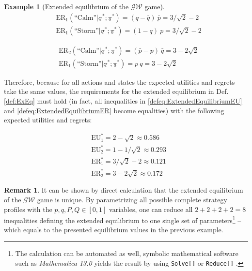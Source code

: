 \documentclass{article}
\theoremstyle{definition}
\newtheorem*{remark}{Remark}
\newtheorem*{example}{Example}
\begin{document}
\begin{example}[Extended equilibrium of the $\mathcal{GW}$ game]
\begin{equation}
\begin{split}
& \mathrm{ER}_1(\text{``Calm''} | \underline{\sigma}^*;\underline{\pi}^*) = (q - \bar{q}) \ \bar{p} = 3/\sqrt{2} - 2\\
& \mathrm{ER}_1(\text{``Storm''} | \underline{\sigma}^*;\underline{\pi}^*) = (1 - q) \ p = 3/\sqrt{2} - 2
\end{split}
\end{equation}

\begin{equation}
\begin{split}
& \mathrm{ER}_2(\text{``Calm''} | \underline{\sigma}^*;\underline{\pi}^*) = (\bar{p} - p) \ \bar{q} = 3 - 2 \sqrt{2}\\
& \mathrm{ER}_1(\text{``Storm''} | \underline{\sigma}^*;\underline{\pi}^*) = p \ q = 3 - 2 \sqrt{2}
\end{split}
\end{equation}

Therefore, because for all actions and states the expected utilities and regrets take the same values, the requirements for the extended equilibrium in Def. \autoref{def:ExEq} must hold (in fact, all inequalities in \eqref{defeq:ExtendedEquilibriumEU} and \eqref{defeq:ExtendedEquilibriumER} become equalities) with the following expected utilities and regrets:

\begin{equation}
    \begin{split}
        &\mathrm{EU}_1^* = 2 - \sqrt{2} \approx 0.586 \\
        &\mathrm{EU}_2^* = 1 - 1/\sqrt{2} \approx 0.293 \\
        &\mathrm{ER}_1^* = 3/\sqrt{2} - 2 \approx 0.121 \\
        &\mathrm{ER}_2^* = 3 - 2 \sqrt{2} \approx 0.172
    \end{split}
\end{equation}

\end{example}

\begin{remark}
    It can be shown by direct calculation that the extended equilibrium of the $\mathcal{GW}$ game is unique.
    By parametrizing all possible complete strategy profiles with the $p, q, P, Q \in [0,1]$ variables, one can reduce all $2+2+2+2=8$ inequalities defining the extended equilibrium to one single set of parameters\footnote{The calculation can be automated as well, symbolic mathematical software such as \textit{Mathematica 13.0} yields the result by using 
    \texttt{Solve[]} or \texttt{Reduce[]} \cite{reference.wolfram_2021_solve,reference.wolfram_2021_reduce}.} -- which equals to the presented equilibrium values in the previous example.
    
\end{remark}
\end{document}
